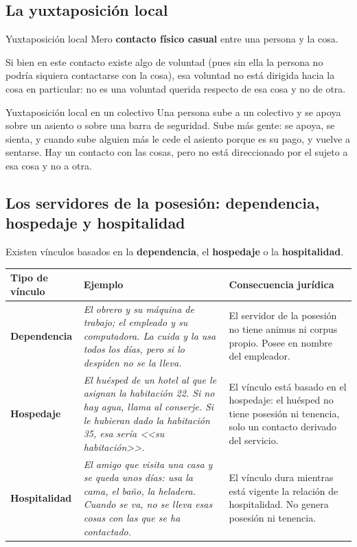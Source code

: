\documentclass[12pt,oneside]{book}
\begin{document}
\subsection{La yuxtaposición local}

\begin{definition}{Yuxtaposición local}
Mero \textbf{contacto físico casual} entre una persona y la cosa.
\end{definition}

Si bien en este contacto existe algo de voluntad (pues sin ella la persona no podría siquiera contactarse con la cosa), esa voluntad no está dirigida hacia la cosa en particular: no es una voluntad querida respecto de esa cosa y no de otra.

\begin{example}{Yuxtaposición local en un colectivo}
Una persona sube a un colectivo y se apoya sobre un asiento o sobre una barra de seguridad. Sube más gente: se apoya, se sienta, y cuando sube alguien más le cede el asiento porque es su pago, y vuelve a sentarse. Hay un contacto con las cosas, pero no está direccionado por el sujeto a esa cosa y no a otra.
\end{example}

\subsection{Los servidores de la posesión: dependencia, hospedaje y hospitalidad}

Existen vínculos basados en la \textbf{dependencia}, el \textbf{hospedaje} o la \textbf{hospitalidad}.

\begin{center}
\begin{tabularx}{\textwidth}{
    >{\raggedright\arraybackslash}p{}
    >{\raggedright\arraybackslash}X
    >{\raggedright\arraybackslash}X
}
\toprule
\textbf{Tipo de vínculo} & \textbf{Ejemplo} & \textbf{Consecuencia jurídica} \\
\midrule
\textbf{Dependencia} &
\textit{El obrero y su máquina de trabajo; el empleado y su computadora. La cuida y la usa todos los días, pero si lo despiden no se la lleva.} &
El servidor de la posesión no tiene animus ni corpus propio. Posee en nombre del empleador. \\
\midrule
\textbf{Hospedaje} &
\textit{El huésped de un hotel al que le asignan la habitación 22. Si no hay agua, llama al conserje. Si le hubieran dado la habitación 35, esa sería <<su habitación>>.} &
El vínculo está basado en el hospedaje: el huésped no tiene posesión ni tenencia, solo un contacto derivado del servicio. \\
\midrule
\textbf{Hospitalidad} &
\textit{El amigo que visita una casa y se queda unos días: usa la cama, el baño, la heladera. Cuando se va, no se lleva esas cosas con las que se ha contactado.} &
El vínculo dura mientras está vigente la relación de hospitalidad. No genera posesión ni tenencia. \\
\bottomrule
\end{tabularx}
\end{center}
\end{document}
